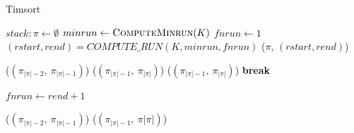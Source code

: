 \documentclass[a4paper, 9pt, twocolumn]{article}
\begin{document}
\begin{algorithm}
  \caption{Timsort}\label{alg:euclid}
  \begin{algorithmic}[1]
    \State $stack: \pi \gets \emptyset$
    \State $minrun \gets \textsc{ComputeMinrun}(K)$
    \State $fnrun \gets 1$
    \State $(rstart, rend) =  COMPUTE\_RUN(K, minrun, fnrun)$
    \State {}($\pi$, $(rstart, rend)$)

    \State {}($(\pi_{|\pi|-2},~\pi_{|\pi|-1})$)
    \Else
    \State {}($(\pi_{|\pi|-1},~\pi_{|\pi|})$)
    \EndIf
    \Else
    \State {}($(\pi_{|\pi|-1},~\pi_{|\pi|})$)
    \Else
    \State \textbf{break}
    \EndIf
    \EndIf
    \EndWhile



    \State $fnrun \gets rend + 1$
    \EndWhile

    \State {}($(\pi_{|\pi|-2},~\pi_{|\pi|-1})$)
    \Else
    \State {}($(\pi_{|\pi|-1},~\pi{|\pi|})$)
    \EndIf

    \EndWhile
    \EndFunction
  \end{algorithmic}
\end{algorithm}
\end{document}
